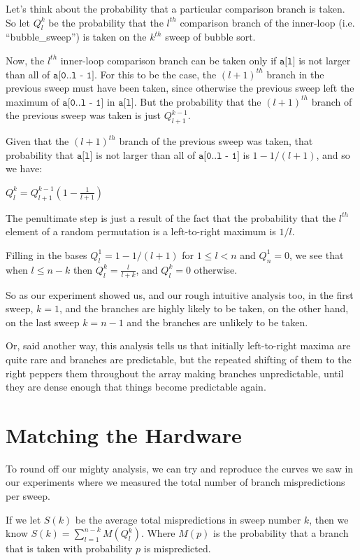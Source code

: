 \documentclass[11pt]{article}
\begin{document}
Let's think about the probability that a particular comparison branch is taken. So let $Q^k_l$ be the probability that the $l^{th}$ comparison branch of the inner-loop (i.e. ``bubble\_sweep'') is taken on the $k^{th}$ sweep of bubble sort.

Now, the $l^{th}$ inner-loop comparison branch can be taken only if $\texttt{a[l]}$ is not larger than all of $\texttt{a[0..l - 1]}$. For this to be the case, the $(l + 1)^{th}$ branch in the previous sweep must have been taken, since otherwise the previous sweep left the maximum of $\texttt{a[0..l - 1]}$ in $\texttt{a[l]}$. But the probability that the $(l + 1)^{th}$ branch of the previous sweep was taken is just $Q^{k-1}_{l + 1}$. 

Given that the $(l + 1)^{th}$ branch of the previous sweep was taken, that probability that $\texttt{a[l]}$ is not larger than all of $\texttt{a[0..l - 1]}$ is $1 - 1/(l + 1)$, and so we have:

$Q^k_l = Q^{k-1}_{l + 1}\left(1 - \frac{1}{l + 1}\right)$

The penultimate step is just a result of the fact that the probability that the $l^{th}$ element of a random permutation is a left-to-right maximum is $1/l$.

Filling in the bases $Q^1_l = 1 - 1/(l + 1)$ for $1 \leq l < n$ and $Q^1_n = 0$, we see that when $l \leq n - k$ then $Q^k_l = \frac{l}{l + k}$, and $Q^k_l = 0$ otherwise.

So as our experiment showed us, and our rough intuitive analysis too, in the first sweep, $k = 1$, and the branches are highly likely to be taken, on the other hand, on the last sweep $k = n - 1$ and the branches are unlikely to be taken. 

Or, said another way, this analysis tells us that initially left-to-right maxima are quite rare and branches are predictable, but the repeated shifting of them to the right peppers them throughout the array making branches unpredictable, until they are dense enough that things become predictable again.

\section{Matching the Hardware}

To round off our mighty analysis, we can try and reproduce the curves we saw in our experiments where we measured the total number of branch mispredictions per sweep.

If we let $S(k)$ be the average total mispredictions in sweep number $k$, then we know
$S(k) = \sum_{l=1}^{n-k}M(Q^k_l)$. Where $M(p)$ is the probability that a branch that is taken with probability $p$ is mispredicted. 
\end{document}
